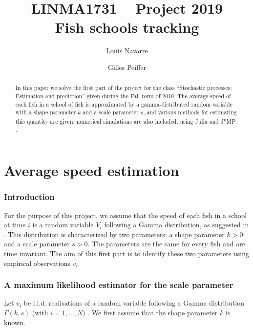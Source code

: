 \documentclass[final]{aomart}
\title[Fish schools tracking]{LINMA1731 -- Project 2019\\
Fish schools tracking}
\author{Louis Navarre}
\author{Gilles Peiffer}
\newtheorem[{}\it]{thm}{Theorem}[section]
\theoremstyle{definition}
\newtheorem*[{}\it]{notation}{Notation}
\numberwithin{equation}{section}
\begin{document}
\begin{abstract}
	In this paper we solve the first part of the project for the class ``Stochastic processes: Estimation and prediction'' given during the Fall term of 2019.
	The average speed of each fish in a school of fish is approximated by a gamma-distributed random variable with a shape parameter \(k\) and a scale parameter \(s\), and various methods for estimating this quantity are given; numerical simulations are also included, using Julia and J\textsuperscript{u}MP \cite{DunningHuchetteLubin2017}.
\end{abstract}

\maketitle
\tableofcontents

\part{Average speed estimation}
\section{Introduction}
For the purpose of this project, we assume that the speed of each fish in a school
at time \(i\) is a random variable \(V_i\) following a Gamma distribution, as suggested in \cite{huth:sim}.
This distribution is characterized by two parameters:
a shape parameter \(k > 0\) and a scale parameter \(s > 0\).
The parameters are the same for every fish and are time invariant.
The aim of this first part is to identify these two parameters using empirical observations \(v_i\).

\section{A maximum likelihood estimator for the scale parameter}
\label{sec:s_est}
Let \(v_i\) be i.i.d. realisations of a random variable following a Gamma distribution \(\Gamma(k, s)\) (with \(i = 1,\ldots, N)\) \cite{wiki:gamma}.
We first assume that the shape parameter \(k\) is known.
\end{document}
